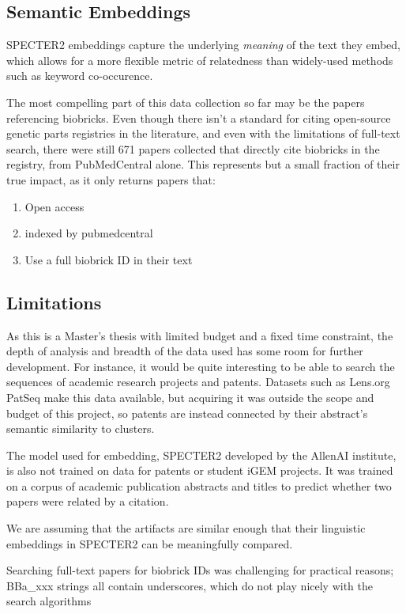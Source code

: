 \documentclass[12pt,a4paper]{article}
\begin{document}
	\subsection{Semantic Embeddings}
	
	SPECTER2 embeddings capture the underlying \textit{meaning} of the text they embed, which allows for a more flexible metric of relatedness than widely-used methods such as keyword co-occurence. 
	
	The most compelling part of this data collection so far may be the papers referencing biobricks. Even though there isn't a standard for citing open-source genetic parts registries in the literature, and even with the limitations of full-text search, there were still 671 papers collected that directly cite biobricks in the registry, from PubMedCentral alone. This represents but a small fraction of their true impact, as it only returns papers that:
	\begin{enumerate}
		\item Open access
		\item indexed by pubmedcentral
		\item Use a full biobrick ID in their text
	\end{enumerate}
	
	
	\subsection{Limitations}
	
	
	As this is a Master's thesis with limited budget and a fixed time constraint, the depth of analysis and breadth of the data used has some room for further development. For instance, it would be quite interesting to be able to search the sequences of academic research projects and patents. Datasets such as Lens.org PatSeq make this data available, but acquiring it was outside the scope and budget of this project, so patents are instead connected by their abstract's semantic similarity to clusters.
	
	The model used for embedding, SPECTER2 developed by the AllenAI institute, is also not trained on data for patents or student iGEM projects. It was trained on a corpus of academic publication abstracts and titles to predict whether two papers were related by a citation.
	
	We are assuming that the artifacts are similar enough that their linguistic embeddings in SPECTER2 can be meaningfully compared.
	
	Searching full-text papers for biobrick IDs was challenging for practical reasons; BBa\_xxx strings all contain underscores, which do not play nicely with the search algorithms
	
\end{document}
